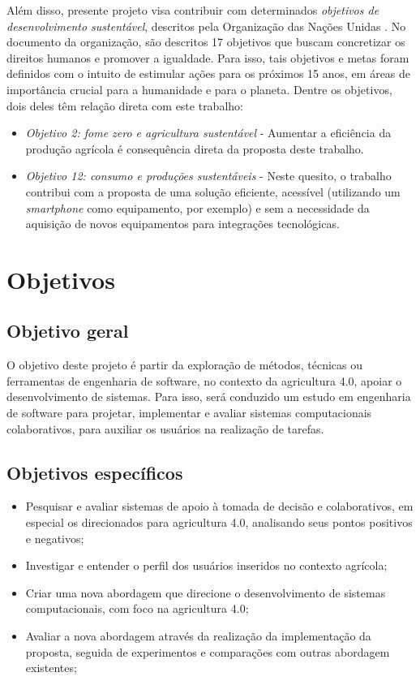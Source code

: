 \documentclass[12pt]{article}
\begin{document}
Além disso, presente projeto visa contribuir com determinados \textit{objetivos de desenvolvimento sustentável}, descritos pela Organização das Nações Unidas \cite{ONU:2020}. No documento da organização, são descritos 17 objetivos que buscam concretizar os direitos humanos e promover a igualdade. Para isso, tais objetivos e metas foram definidos com o intuito de estimular ações para os próximos 15 anos, em áreas de importância crucial para a humanidade e para o planeta. Dentre os objetivos, dois deles têm relação direta com este trabalho:

\begin{itemize}
	\item \textit{Objetivo 2: fome zero e agricultura sustentável} - Aumentar a eficiência da produção agrícola é consequência direta da proposta deste trabalho.
	\item \textit{Objetivo 12: consumo e produções sustentáveis} - Neste quesito, o trabalho contribui com a proposta de uma solução eficiente, acessível (utilizando um \textit{smartphone} como equipamento, por exemplo) e sem a necessidade da aquisição de novos equipamentos para integrações tecnológicas.
\end{itemize}

\section{Objetivos}
\label{sec:objetivos}

\subsection{Objetivo geral}
\label{subsec:objetivo_geral}

O objetivo deste projeto é partir da exploração de métodos, técnicas ou ferramentas de engenharia de software, no contexto da agricultura 4.0, apoiar o desenvolvimento de sistemas. Para isso, será conduzido um estudo em engenharia de software para projetar, implementar e avaliar sistemas computacionais colaborativos, para auxiliar os usuários na realização de tarefas.

\subsection{Objetivos específicos}
\label{subsec:objetivos_especificos}

\begin{itemize}
	\item Pesquisar e avaliar sistemas de apoio à tomada de decisão e colaborativos, em especial os direcionados para agricultura 4.0, analisando seus pontos positivos e negativos;
	\item Investigar e entender o perfil dos usuários inseridos no contexto agrícola;
	\item Criar uma nova abordagem que direcione o desenvolvimento de sistemas computacionais, com foco na agricultura 4.0;
	\item Avaliar a nova abordagem através da realização da implementação da proposta, seguida de experimentos e comparações com outras abordagem existentes;
\end{itemize}
\end{document}
